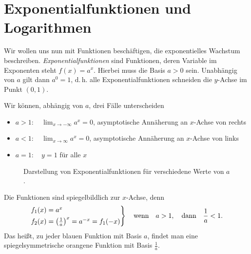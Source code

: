 \section{Exponentialfunktionen und Logarithmen}

Wir wollen uns nun mit Funktionen beschäftigen, die exponentielles Wachstum beschreiben. \emph{Exponentialfunktionen} sind Funktionen, deren Variable im Exponenten steht $f(x) = a^x$. Hierbei muss die Basis $a > 0$ sein. Unabhängig von $a$ gilt dann $a^0 = 1$, d.\,h. alle Exponentialfunktionen schneiden die $y$-Achse im Punkt $(0,1)$. 

Wir können, abhängig von $a$, drei Fälle unterscheiden 
\begin{itemize}
    \item $a > 1: \quad \lim_{x\to -\infty} a^x = 0$, asymptotische Annäherung an $x$-Achse von rechts
    \item $a < 1: \quad \lim_{x\to \infty} a^x = 0$, asymptotische Annäherung an $x$-Achse von links 
    \item $a = 1: \quad y=1$ für alle $x$
\end{itemize}

\begin{figure}[htp]
    \centering
    \caption{Darstellung von Exponentialfunktionen für verschiedene Werte von $a$.}
\end{figure} 
Die Funktionen sind spiegelbildlich zur $x$-Achse, denn 
\begin{align}
    \begin{rcases}
        f_1(x) = a^x \\
        f_2(x) = \qty(\frac{1}{a})^x = a^{-x} = f_1(-x) 
    \end{rcases} \qq{wenn} a >1, \qq{dann} \frac{1}{a} < 1.
\end{align}
Das heißt, zu jeder \textcolor{FSUblau}{blauen} Funktion mit Basis $a$, findet man eine spiegelsymmetrische \textcolor{PAForange}{orangene} Funktion mit Basis $\frac{1}{a}$.

